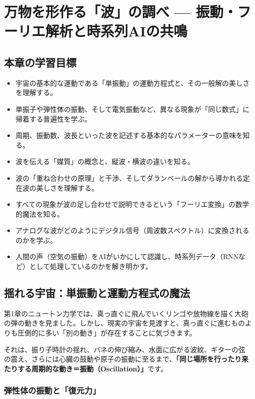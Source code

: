 \chapter{万物を形作る「波」の調べ --- 振動・フーリエ解析と時系列AIの共鳴}

\section*{本章の学習目標}
\begin{itemize}
\item 宇宙の基本的な運動である「単振動」の運動方程式と、その一般解の美しさを理解する。
\item 単振子や弾性体の振動、そして電気振動など、異なる現象が「同じ数式」に帰着する普遍性を学ぶ。
\item 周期、振動数、波長といった波を記述する基本的なパラメーターの意味を知る。
\item 波を伝える「媒質」の概念と、縦波・横波の違いを知る。
\item 波の「重ね合わせの原理」と干渉、そしてダランベールの解から導かれる定在波の美しさを理解する。
\item すべての現象が波の足し合わせで説明できるという「フーリエ変換」の数学的魔法を知る。
\item アナログな波がどのようにデジタル信号（周波数スペクトル）に変換されるのかを学ぶ。
\item 人間の声（空気の振動）をAIがいかにして認識し、時系列データ（RNNなど）として処理しているのかを解き明かす。
\end{itemize}

\section{揺れる宇宙：単振動と運動方程式の魔法}

第1章のニュートン力学では、真っ直ぐに飛んでいくリンゴや放物線を描く大砲の弾の動きを見ました。しかし、現実の宇宙を見渡すと、真っ直ぐに進むものよりも圧倒的に多い「別の動き」が存在することに気づきます。

それは、振り子時計の揺れ、バネの伸び縮み、水面に広がる波紋、ギターの弦の震え、さらには心臓の鼓動や原子の振動に至るまで、\textbf{「同じ場所を行ったり来たりする周期的な動き＝振動（Oscillation）」}です。

\subsection{弾性体の振動と「復元力」}

